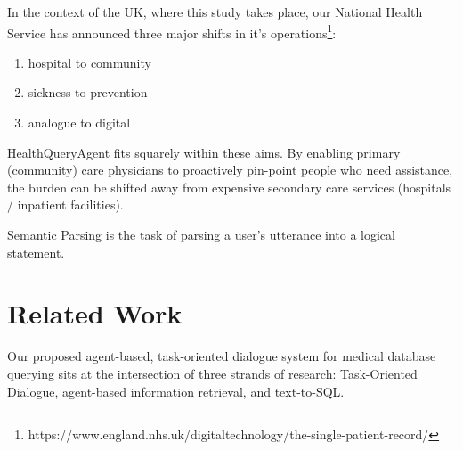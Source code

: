 \documentclass[11pt]{article}
\begin{document}


In the context of the UK, where this study takes place, our National Health Service has announced three major shifts in it's operations\footnote{https://www.england.nhs.uk/digitaltechnology/the-single-patient-record/}:

\begin{enumerate}
	\item hospital to community
	\item sickness to prevention
	\item analogue to digital
\end{enumerate}

HealthQueryAgent fits squarely within these aims. By enabling primary (community) care physicians to proactively pin-point people who need assistance, the burden can be shifted away from expensive secondary care services (hospitals / inpatient facilities).


Semantic Parsing is the task of parsing a user's utterance into a logical statement.

\citet{ziletti_retrieval_2024} \citet{ziletti_generating_2025}

\section{Related Work}

Our proposed agent-based, task-oriented dialogue system for medical database querying sits at the intersection of three strands of research: Task-Oriented Dialogue, agent-based information retrieval, and text-to-SQL.
\end{document}
